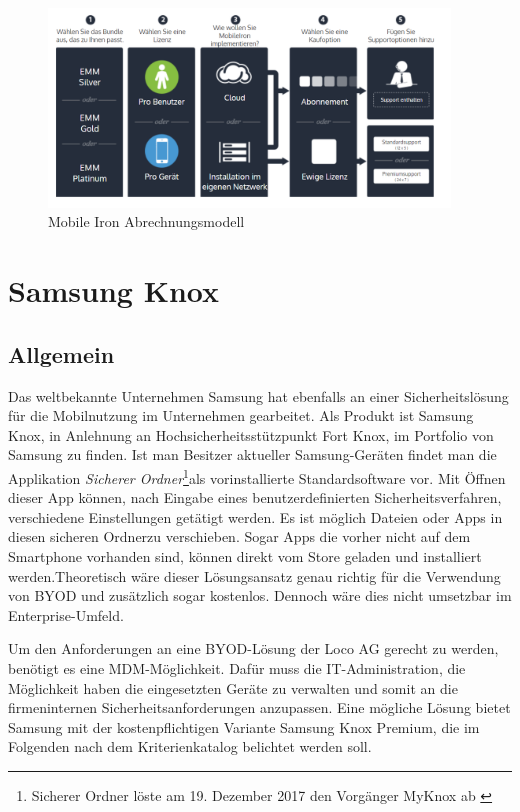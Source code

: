 \begin{figure}[hbt]
\centering
\includegraphics[width=0.95\textwidth]{Bilder/mi_2.png} 
\caption{Mobile Iron Abrechnungsmodell}\label{fig:MobIro2}
\end{figure}

\newpage

\section{Samsung Knox}
\subsection{Allgemein}\label{sub:Allgemein}
Das weltbekannte Unternehmen Samsung hat ebenfalls an einer Sicherheitslösung für die Mobilnutzung im Unternehmen gearbeitet. Als Produkt ist Samsung Knox, in Anlehnung an Hochsicherheitsstützpunkt Fort Knox, im Portfolio von Samsung zu finden.
Ist man Besitzer aktueller Samsung-Geräten findet man die Applikation \textit{Sicherer Ordner}\footnote{Sicherer Ordner löste am 19. Dezember 2017 den Vorgänger MyKnox ab \cite{sam2017b} }als vorinstallierte Standardsoftware vor. Mit Öffnen dieser App können, nach Eingabe eines benutzerdefinierten Sicherheitsverfahren, verschiedene Einstellungen getätigt werden. Es ist möglich Dateien oder Apps in diesen \flqq sicheren Ordner\frqq  zu verschieben. Sogar Apps die vorher nicht auf dem Smartphone vorhanden sind, können direkt vom Store geladen und installiert werden.Theoretisch wäre dieser Lösungsansatz genau richtig für die Verwendung von BYOD und zusätzlich sogar kostenlos. Dennoch wäre dies nicht umsetzbar im Enterprise-Umfeld.

Um den Anforderungen an eine BYOD-Lösung der Loco AG gerecht zu werden, benötigt es eine MDM-Möglichkeit. Dafür muss die IT-Administration, die Möglichkeit haben die eingesetzten Geräte zu verwalten und somit an die firmeninternen Sicherheitsanforderungen anzupassen. Eine mögliche Lösung bietet Samsung mit der kostenpflichtigen Variante Samsung Knox Premium, die im Folgenden nach dem Kriterienkatalog belichtet werden soll. 

